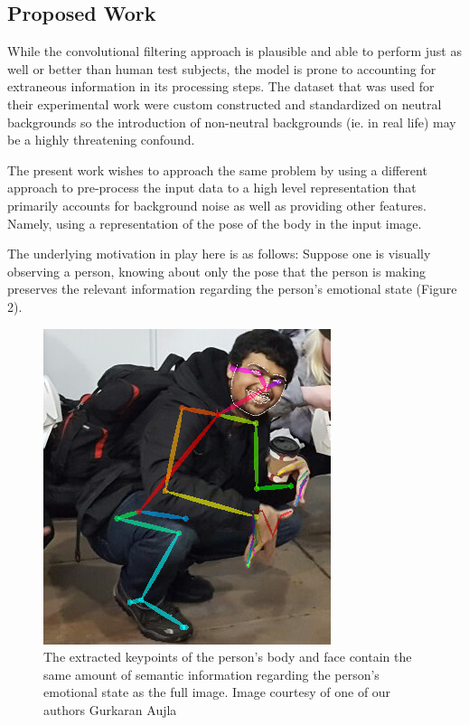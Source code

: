 \documentclass{article}
\begin{document}
\subsection{Proposed Work}

While the convolutional filtering approach is plausible and able to perform just as well or better than human test subjects, the model is prone to accounting for extraneous information in its processing steps. The dataset that was used for their experimental work were custom constructed and standardized on neutral backgrounds so the introduction of non-neutral backgrounds (ie. in real life) may be a highly threatening confound.

The present work wishes to approach the same problem by using a different approach to pre-process the input data to a high level representation that primarily accounts for background noise as well as providing other features. Namely, using a representation of the pose of the body in the input image.

The underlying motivation in play here is as follows: Suppose one is visually observing a person, knowing about only the pose that the person is making preserves the relevant information regarding the person's emotional state (Figure 2).

\begin{figure}[h]
	\centering
	\includegraphics[scale=0.45]{kran}
	\caption{The extracted keypoints of the person's body and face contain the same amount of semantic information regarding the person's emotional state as the full image. Image courtesy of one of our authors Gurkaran Aujla}
\end{figure}
\end{document}
